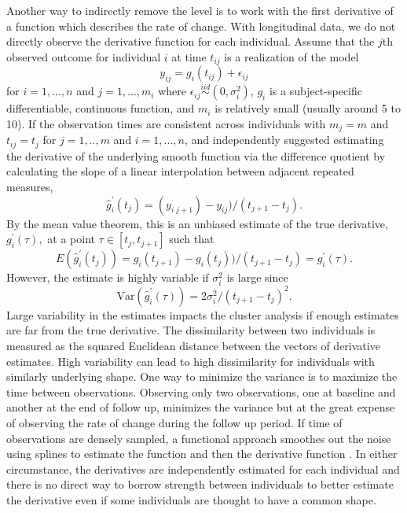 \documentclass[12pt]{article}
\begin{document}
Another way to indirectly remove the level is to work with the first derivative of a function which describes the rate of change. With longitudinal data, we do not directly observe the derivative function for each individual. Assume that the $j$th observed outcome for individual $i$ at time $t_{ij}$ is a realization of the model
$$y_{ij}= g_i(t_{ij})+\epsilon_{ij}$$
for $i=1,...,n$ and $j=1,...,m_{i}$ where $\epsilon_{ij}\overset{iid}{\sim} (0,\sigma_{i}^{2})$, $g_{i}$ is a subject-specific differentiable, continuous function, and $m_{i}$ is relatively small (usually around 5 to 10). If the observation times are consistent across individuals with $m_{j}=m$ and $t_{ij} = t_{j}$ for $j=1,..,m$ and $i=1,...,n$, \Textcite{moller2003} and \textcite{d2000} independently suggested estimating the derivative of the underlying smooth function via the difference quotient by calculating the slope of a linear interpolation between adjacent repeated measures,
$$\hat{g}_{i}^{'}(t_{j}) = (y_{i\;j+1})-y_{ij})/(t_{j+1}-t_j).$$
By the mean value theorem, this is an unbiased estimate of the true derivative, $g_{i}^{'}(\tau),$ at a point $\tau\in[t_{j},t_{j+1}]$ such that
$$E(\hat{g}_{i}^{'}(t_{j})) = g_i(t_{j+1})-g_i(t_j))/(t_{j+1}-t_j) =g_{i}^{'}(\tau). $$
However, the estimate is highly variable if $\sigma_{i}^{2}$ is large since
$$\text{Var}(\hat{g}_{i}^{'}(\tau)) =  2\sigma^{2}_{i}/ (t_{j+1}-t_j)^{2}.$$
Large variability in the estimates impacts the cluster analysis if enough estimates are far from the true derivative. The dissimilarity between two individuals is measured as the squared Euclidean distance between the vectors of derivative estimates. High variability can lead to high dissimilarity for individuals with similarly underlying shape. One way to minimize the variance is to maximize the time between observations. Observing only two observations, one at baseline and another at the end of follow up, minimizes the variance but at the great expense of observing the rate of change during the follow up period. If time of observations are densely sampled, a functional approach smoothes out the noise using splines to estimate the function and then the derivative function \cite{tarpey2003}. In either circumstance, the derivatives are independently estimated for each individual and there is no direct way to borrow strength between individuals to better estimate the derivative even if some individuals are thought to have a common shape.
\end{document}
